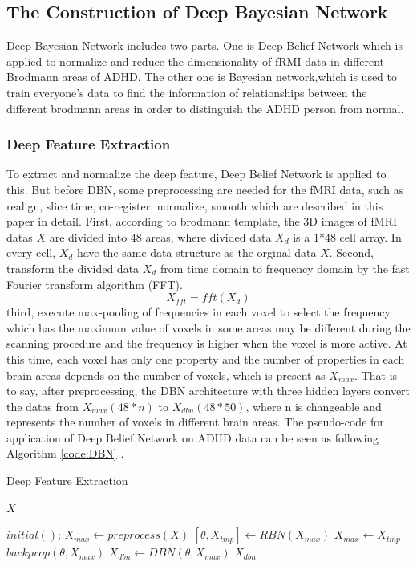 \documentclass[10pt,twocolumn,letterpaper]{article}
\begin{document}
\subsection{The Construction of Deep Bayesian Network}
Deep Bayesian Network includes two parts. One is Deep Belief Network which is applied to normalize and reduce the dimensionality of fRMI data in different Brodmann areas of ADHD. The other one is Bayesian network,which is used to train everyone's data to find the information of relationships between the different brodmann areas in order to distinguish the ADHD person from normal.

\subsubsection{Deep Feature Extraction}
To extract and normalize the deep feature, Deep Belief Network  is applied to this. But before DBN, some preprocessing are needed for the fMRI data, such as realign, slice time, co-register, normalize, smooth which are described in this paper\cite{18} in detail. First, according to brodmann template, the 3D images of fMRI datas $X$ are divided into 48 areas, where divided data $X_d$ is a 1*48 cell array. In every cell, $X_d$ have the same data structure as the orginal data $X$. Second, transform the divided data $X_d$ from time domain to frequency domain by the fast Fourier transform algorithm (FFT). 
\begin{equation}
X_{fft} = fft(X_d)
\end{equation}
third, execute max-pooling of frequencies in each voxel to select the frequency which has the maximum value of voxels in some areas may be different during the scanning procedure and the frequency is higher when the voxel is more active. At this time, each voxel has only one property and the number of properties in each brain areas depends on the number of voxels, which is present as $X_{max}$. That is to say, after preprocessing, the DBN architecture with three hidden layers convert the datas from $X_{max} (48*n)$  to $X_{dbn} (48*50)$, where n is changeable and represents the number of voxels in different brain areas. The pseudo-code for application of Deep Belief Network on ADHD data can be seen as following Algorithm \ref{code:DBN} .
\begin{algorithm}[h]
\caption{Deep Feature Extraction}
\label{code:DBN}
\begin{algorithmic}[1]
\Require
$X$

\State $initial()$;
\State $X_{max} \gets preprocess(X)$  
 
\State $[\theta,X_{tmp}]\gets RBN(X_{max})$ 
\State $X_{max} \gets X_{tmp}$ 
\EndFor
\State $backprop(\theta,X_{max})$ 
\State $X_{dbn} \gets DBN(\theta,X_{max})$ 
\Ensure
$X_{dbn}$
\end{algorithmic}
\end{algorithm}
\end{document}
